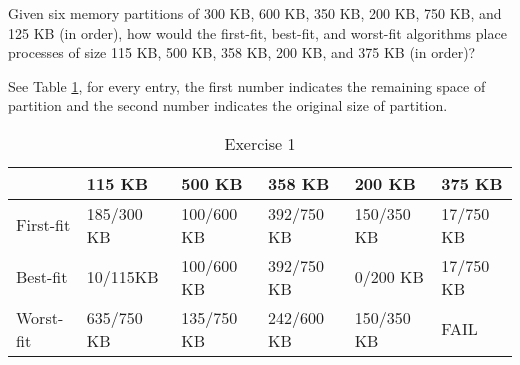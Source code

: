 \begin{exercise}[]{
    Given six memory partitions of 300 KB, 600 KB, 350 KB, 200 KB, 750 KB,
    and 125 KB (in order), how would the first-fit, best-fit, and worst-fit
    algorithms place processes of size 115 KB, 500 KB, 358 KB, 200 KB, and
    375 KB (in order)?}
  \begin{solution}
    See Table \ref{1}, for every entry, the first number indicates the remaining space of partition and the second number indicates the original size of partition.
    \begin{table}[h]
        \centering
        \begin{tabular}{llllll}
            \hline
            & 115 KB     & 500 KB     & 358 KB     & 200 KB     & 375 KB    \\ \hline
  First-fit & 185/300 KB & 100/600 KB & 392/750 KB & 150/350 KB & 17/750 KB \\
  Best-fit  & 10/115KB   & 100/600 KB & 392/750 KB & 0/200 KB   & 17/750 KB \\
  Worst-fit & 635/750 KB & 135/750 KB & 242/600 KB & 150/350 KB & FAIL      \\ \hline
        \end{tabular}
        \caption{Exercise 1\label{1}}
        \end{table}
  \end{solution}
  \label{ex1}
\end{exercise}



